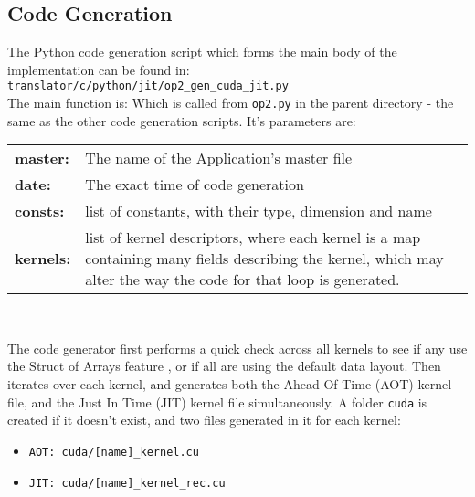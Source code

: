 \subsection{Code Generation}
The Python code generation script which forms the main body of the implementation can be found in: \verb|translator/c/python/jit/op2_gen_cuda_jit.py|
\\
The main function is:
Which is called from \verb|op2.py| in the parent directory - the same as the other code generation scripts. It's parameters are:\\
\begin{tabular}{>{\bfseries}l l}
  master: & The name of the Application's master file \\
  date: & The exact time of code generation \\
  consts: & list of constants, with their type, dimension and name \\
  kernels: & \parbox[t]{.8\textwidth}{list of kernel descriptors, where each kernel is a map containing many fields describing the kernel, which may alter the way the code for that loop is generated.}
\end{tabular}
\\
\par
The code generator first performs a quick check across all kernels to see if any use the Struct of Arrays feature \cite[p9]{manual}, or if all are using the default data layout. Then iterates over each kernel, and generates both the Ahead Of Time (AOT) kernel file, and the Just In Time (JIT) kernel file simultaneously. A folder \verb|cuda| is created if it doesn't exist, and two files generated in it for each kernel:
\begin{itemize}
\item{\verb|AOT: cuda/[name]_kernel.cu|}
\item{\verb|JIT: cuda/[name]_kernel_rec.cu|}
\end{itemize}


